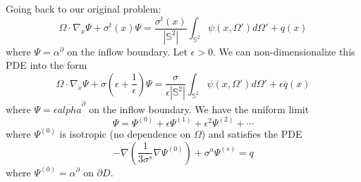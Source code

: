 \documentclass{article}
\theoremstyle{definition}
\theoremstyle{definition}
\begin{document}
Going back to our original problem:
$$\Omega\cdot \nabla_x \Psi+\sigma^t(x)\Psi=\frac{\sigma^t(x)}{|\mathbb{S}^2|}\int_{\mathbb{S}^2}\psi(x,\Omega')d\Omega'+q(x)$$
where
$\Psi=\alpha^{\partial}$ on the inflow boundary. Let $\epsilon>0$. We can non-dimensionalize this PDE into the form
$$\Omega\cdot \nabla_x \Psi+\sigma\left(\epsilon+\frac{1}{\epsilon}\right)\Psi=\frac{\sigma}{\epsilon|\mathbb{S}^2|}\int_{\mathbb{S}^2}\psi(x,\Omega')d\Omega'+\epsilon \overline{q}(x)$$
where $\Psi=\epsilon \overline{alpha}^{\partial}$ on the inflow boundary. We have the uniform limit
$$\Psi=\Psi^{(0)}+\epsilon \Psi^{(1)}+\epsilon^2\Psi^{(2)}+\cdots$$
where $\Psi^{(0)}$ is isotropic (no dependence on $\Omega$) and satisfies the PDE
$$-\nabla \left(\frac{1}{3\sigma^{s}}\nabla \Psi^{(0)}\right)+\sigma^{a}\Psi^{(s)}=q$$
where $\Psi^{(0)}=\alpha^{\partial}$ on $\partial D$.
\end{document}

